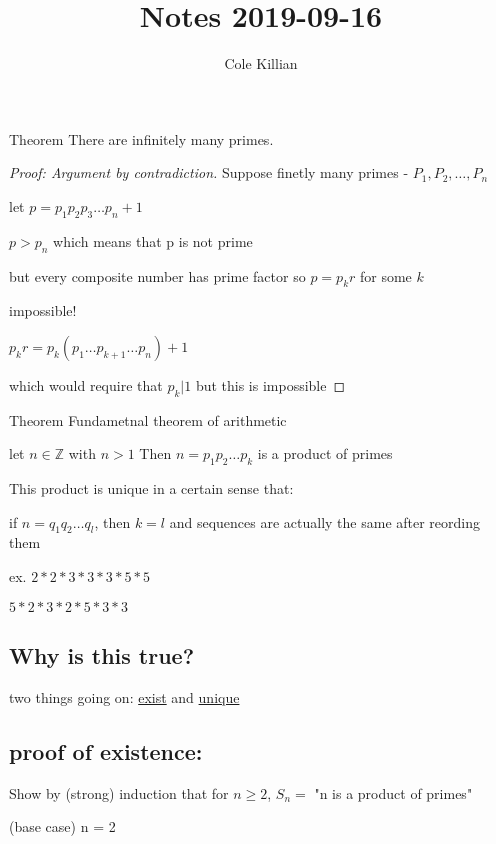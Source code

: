 \documentclass[class=scrartcl, crop=false]{standalone}
\begin{document}
\title{Notes 2019-09-16}
\author{Cole Killian}

\begin{theorem}
  
  Theorem There are infinitely many primes.
\end{theorem}

\begin{proof}[Proof: Argument by contradiction]

Suppose finetly many primes - $P_1, P_2, \dots, P_n$ 

let $p = p_1p_2p_3\dots p_n + 1$

 $p > p_n $ which means that p is not prime

 but every composite number has prime factor so $p = p_k r$ for some $k$ 

 impossible!

 $p_k r = p_k(p_1 \dots p_{k+1} \dots p_n) + 1$

 which would require that  $p_k | 1$ but this is impossible
\end{proof}

\begin{theorem}
  
 Theorem Fundametnal theorem of arithmetic

 let $n \in \mathbb{Z}$ with $n > 1$ 
 Then $n = p_1p_2\dots p_k$ is a product of primes

 This product is unique in a certain sense that:

 if $n = q_1q_2\dots q_l$, then $k = l$ and sequences are actually the same after reording them

 ex. $2 * 2 * 3 * 3 * 3 * 5 * 5$ 

 $5 * 2 * 3 * 2 * 5 * 3 * 3$

\end{theorem}
 \subsection*{Why is this true?}

 two things going on: \underline{exist} and \underline{unique}

 \subsection*{proof of existence:}

 Show by (strong) induction that for  $n \geq 2$,
$S_n = $ "n is a product of primes"

(base case) n = 2
\end{document}
